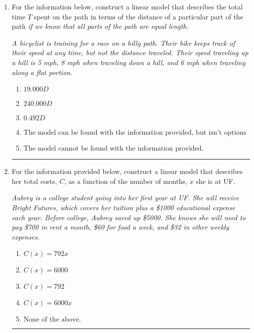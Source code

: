 \documentclass[14pt]{extbook}
\newcommand{\litem}[1]{\item#1\hspace*{-1cm}\rule{\textwidth}{0.4pt}}
\begin{document}
\begin{enumerate}
{\begin{enumerate}[label=\Alph*.]
\end{enumerate} }
\litem{
For the information below, construct a linear model that describes the total time $T$ spent on the path in terms of the distance of a particular part of the path \textit{if we know that all parts of the path are equal length}.
\begin{center}
    \textit{ A bicyclist is training for a race on a hilly path. Their bike keeps track of their speed at any time, but not the distance traveled. Their speed traveling up a hill is 5 mph, 8 mph when traveling down a hill, and 6 mph when traveling along a flat portion. }
\end{center}
\begin{enumerate}[label=\Alph*.]
\item \( 19.000 D \)
\item \( 240.000 D \)
\item \( 0.492 D \)
\item \( \text{The model can be found with the information provided, but isn't options 1-3.} \)
\item \( \text{The model cannot be found with the information provided.} \)

\end{enumerate} }
\litem{
For the information provided below, construct a linear model that describes her total costs, $C$, as a function of the number of months, $x$ she is at UF. 
\begin{center}
    \textit{ Aubrey is a college student going into her first year at UF. She will receive Bright Futures, which covers her tuition plus a \$1000 educational expense each year. Before college, Aubrey saved up \$5000. She knows she will need to pay \$700 in rent a month, \$60 for food a week, and \$32 in other weekly expenses. }
\end{center}
\begin{enumerate}[label=\Alph*.]
\item \( C(x) = 792 x \)
\item \( C(x) = 6000 \)
\item \( C(x) = 792 \)
\item \( C(x) = 6000 x \)
\item \( \text{None of the above.} \)


\end{enumerate}}
\end{enumerate}
\end{document}
